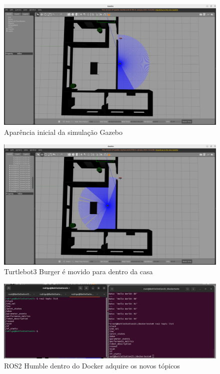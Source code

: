 \begin{figure}[htb]
    \centering
    \includegraphics[width=1\linewidth]{Figures/GazeboLancado.png}
    \caption{Aparência inicial da simulação Gazebo}
    \label{fig:enter-label}
\end{figure}
\begin{figure}[htb]
    \centering
    \includegraphics[width=1\linewidth]{Figures/BurgerMovido.png}
    \caption{Turtlebot3 Burger é movido para dentro da casa}
    \label{fig:enter-label}
\end{figure}
\begin{figure}[htb]
    \centering
    \includegraphics[width=1\linewidth]{Figures/DockerAdquireTopicos.png}
    \caption{ROS2 Humble dentro do Docker adquire os novos tópicos}
    \label{fig:enter-label}
\end{figure}

